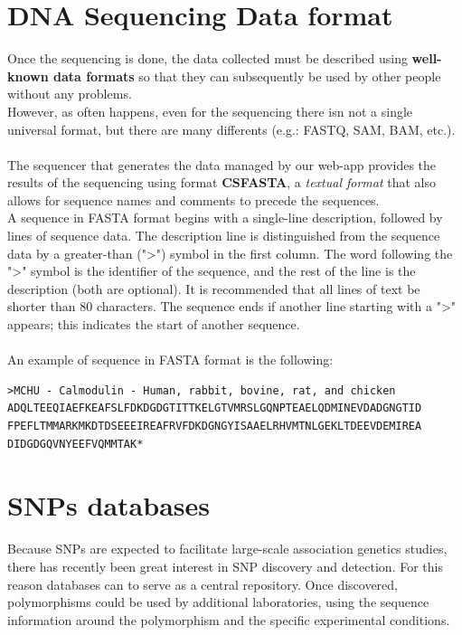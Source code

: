 \newpage


\section{DNA Sequencing Data format}

Once the sequencing is done, the data collected must be described using \textbf{well-known data formats} so that they can subsequently be used by other people without any problems.
\\ However, as often happens, even for the sequencing there isn not a single universal format, but there are many differents (e.g.: FASTQ, SAM, BAM, etc.). 
\\
\\The sequencer that generates the data managed by our web-app provides the results of the sequencing using format \textbf{CSFASTA}, a \emph{textual format} that also allows for sequence names and comments to precede the sequences.
\\A sequence in FASTA format begins with a single-line description, followed by lines of sequence data. The description line is distinguished from the sequence data by a greater-than (">") symbol in the first column. The word following the ">" symbol is the identifier of the sequence, and the rest of the line is the description (both are optional). It is recommended that all lines of text be shorter than 80 characters. The sequence ends if another line starting with a ">" appears; this indicates the start of another sequence.
\\
\\An example of sequence in FASTA format is the following:

\vspace{5mm}

\begin{lstlisting}     
>MCHU - Calmodulin - Human, rabbit, bovine, rat, and chicken
ADQLTEEQIAEFKEAFSLFDKDGDGTITTKELGTVMRSLGQNPTEAELQDMINEVDADGNGTID
FPEFLTMMARKMKDTDSEEEIREAFRVFDKDGNGYISAAELRHVMTNLGEKLTDEEVDEMIREA
DIDGDGQVNYEEFVQMMTAK*
\end{lstlisting}


\section{SNPs databases}

Because SNPs are expected to facilitate large-scale association genetics studies, there has recently been great interest in SNP discovery and detection. For this reason databases can to serve as a central repository. Once discovered, polymorphisms could be used by additional laboratories, using the sequence information around the polymorphism and the specific experimental conditions.

